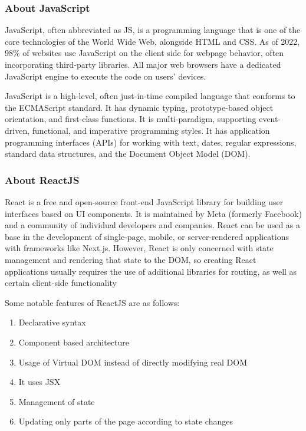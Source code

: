 \subsubsection{About JavaScript}
JavaScript, often abbreviated as JS, is a programming language that is one of
the core technologies of the World Wide Web, alongside HTML and CSS. As of 2022,
98\% of websites use JavaScript on the client side for webpage behavior, often
incorporating third-party libraries. All major web browsers have a dedicated
JavaScript engine to execute the code on users' devices.

JavaScript is a high-level, often just-in-time compiled language that conforms
to the ECMAScript standard. It has dynamic typing, prototype-based
object orientation, and first-class functions. It is multi-paradigm, supporting
event-driven, functional, and imperative programming styles. It has application
programming interfaces (APIs) for working with text, dates, regular expressions,
standard data structures, and the Document Object Model (DOM).

\subsubsection{About ReactJS}
React is a free and open-source front-end JavaScript library for building user
interfaces based on UI components. It is maintained by Meta (formerly Facebook)
and a community of individual developers and companies. React can be used as a
base in the development of single-page, mobile, or server-rendered applications
with frameworks like Next.js. However, React is only concerned with state
management and rendering that state to the DOM, so creating React applications
usually requires the use of additional libraries for routing, as well as certain
client-side functionality

Some notable features of ReactJS are as follows:
\begin{enumerate}
    \item Declarative syntax
    \item Component based architecture
    \item Usage of Virtual DOM instead of directly modifying real DOM
    \item It uses JSX
    \item Management of state
    \item Updating only parts of the page according to state changes
\end{enumerate}

